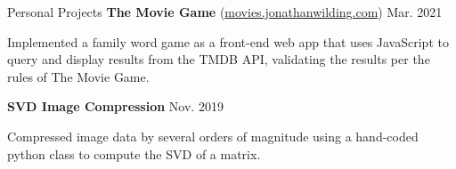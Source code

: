 \documentclass{resume} %
\begin{document}
\begin{rSection}{Personal Projects}
    \textbf{The Movie Game} (\href{https://movies.jonathanwilding.com}{movies.jonathanwilding.com}) \hfill{Mar. 2021}
    \begin{compactitem}
        \item  Implemented a family word game as a front-end web app that uses JavaScript to query
            and display results from the TMDB API, validating the results per the rules of The
            Movie Game.
    \end{compactitem}
    \textbf{SVD Image Compression} \hfill{Nov. 2019}
    \begin{compactitem}
        \item Compressed image data by several orders of magnitude using a hand-coded python class
            to compute the SVD of a matrix.
    \end{compactitem}
\end{rSection}
\end{document}
